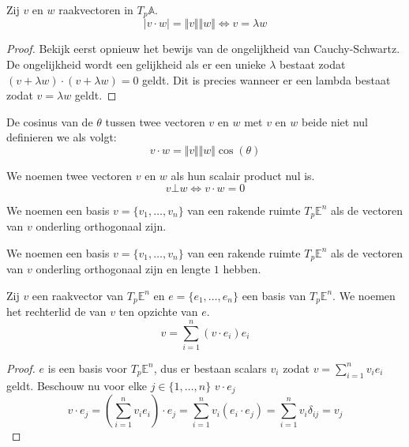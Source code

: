 \documentclass[main.tex]{subfiles}
\begin{document}
\begin{ei}
  Zij $v$ en $w$ raakvectoren in $T_{p}\mathbb{A}$.
  \[ |v \cdot w| = \Vert v \Vert \Vert w \Vert \Leftrightarrow v = \lambda w \]

  \begin{proof}
    Bekijk eerst opnieuw het bewijs van de ongelijkheid van Cauchy-Schwartz.
    De ongelijkheid wordt een gelijkheid als er een unieke $\lambda$ bestaat zodat $(v+\lambda w) \cdot (v + \lambda w) = 0$ geldt.
    Dit is precies wanneer er een lambda bestaat zodat $v=\lambda w$ geldt.
  \end{proof}
\end{ei}

\begin{de}
  De cosinus van de  $\theta$ tussen twee vectoren $v$ en $w$ met $v$ en $w$ beide niet nul definieren we als volgt:
  \[ v \cdot w = \Vert v \Vert \Vert w \Vert \cos(\theta) \]
\end{de}

\begin{de}
  We noemen twee vectoren $v$ en $w$  als hun scalair product nul is.
  \[ v \bot w \Leftrightarrow v \cdot w = 0 \]
\end{de}

\begin{de}
  We noemen een basis $v = \{ v_{1}, \dotsc, v_{n} \}$ van een rakende ruimte $T_{p}\mathbb{E}^{n}$  als de vectoren van $v$ onderling orthogonaal zijn.
\end{de}

\begin{de}
  We noemen een basis $v = \{ v_{1}, \dotsc, v_{n} \}$ van een rakende ruimte $T_{p}\mathbb{E}^{n}$  als de vectoren van $v$ onderling orthogonaal zijn en lengte $1$ hebben.
\end{de}

\begin{st}
  Zij $v$ een raakvector van $T_{p}\mathbb{E}^{n}$ en $e = \{ e_{1}, \dotsc, e_{n} \}$ een basis van $T_{p}\mathbb{E}^{n}$.
  We noemen het rechterlid de  van $v$ ten opzichte van $e$.
  \[ v = \sum_{i=1}^{n} (v \cdot e_{i})e_{i} \]

  \begin{proof}
    $e$ is een basis voor $T_{p}\mathbb{E}^{n}$, dus er bestaan scalars $v_{i}$ zodat $v = \sum_{i=1}^{n}v_{i}e_{i}$ geldt.
    Beschouw nu voor elke $j \in \{ 1,\dotsc,n \}$ $v\cdot e_{j}$
    \[ v \cdot e_{j}
    = \left(\sum_{i=1}^{n}v_{i}e_{i}\right) \cdot e_{j}
    = \sum_{i=1}^{n}v_{i}(e_{i}\cdot e_{j})
    = \sum_{i=1}^{n}v_{i}\delta_{ij} = v_{j}
    \]
  \end{proof}
\end{st}
\end{document}
